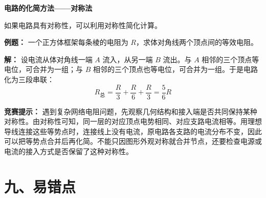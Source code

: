 \begin{competitionbox}
\textbf{电路的化简方法——对称法}

如果电路具有对称性，可以利用对称性简化计算。

\textbf{例题：} 一个正方体框架每条棱的电阻为 $R$，求体对角线两个顶点间的等效电阻。

\begin{center}


\label{fig:cube-resistor-network}
\end{center}

\begin{center}


\label{fig:cube-equivalent-network}
\end{center}

\textbf{解：} 设电流从体对角线一端 $A$ 流入，从另一端 $B$ 流出。与 $A$ 相邻的三个顶点等电位，可合并为一组；与 $B$ 相邻的三个顶点也等电位，可合并为一组。于是电路化为三段串联：
\[
R_{\text{总}} = \frac{R}{3}+\frac{R}{6}+\frac{R}{3}=\frac{5}{6}R
\]

\textbf{竞赛提示：} 遇到复杂网络电阻问题，先观察几何结构和接入端是否共同保持某种对称性。由对称性可知，同一层的对应顶点电势相同、对应支路电流相等。用理想导线连接这些等势点时，连接线上没有电流，原电路各支路的电流分布不变，因此可以把等势点合并后再化简。不能只因图形外观对称就合并节点，还要检查电源或电流的接入方式是否保留了这种对称性。
\end{competitionbox}

\section*{九、易错点}

